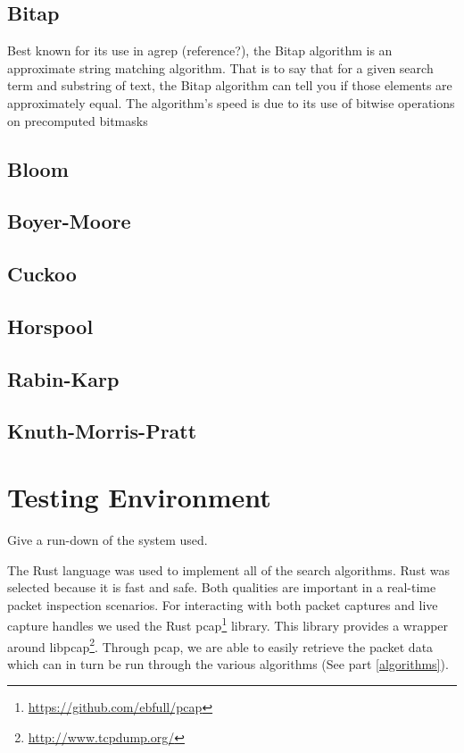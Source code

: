 \documentclass{article}
\begin{document}
\subsection{Bitap}

Best known for its use in agrep (reference?), the Bitap algorithm \cite{Baeza1992} is an approximate string matching algorithm. That is to say that for a given search term and substring of text, the Bitap algorithm can tell you if those elements are approximately equal. The algorithm's speed is due to its use of bitwise operations on precomputed bitmasks 

\subsection{Bloom}
\cite{Bloom1970}
\subsection{Boyer-Moore}
\cite{Boyer1977}
\subsection{Cuckoo}
\cite{Fan2014}
\subsection{Horspool}
\cite{Horspool1980}
\subsection{Rabin-Karp}
\cite{Karp1987}
\subsection{Knuth-Morris-Pratt}
\cite{Knuth1977}

\section{Testing Environment}	
Give a run-down of the system used.

The Rust language was used to implement all of the search algorithms. Rust was selected because it is fast and safe. Both  qualities are important in a real-time packet inspection scenarios. For interacting with both packet captures and live capture handles we used the Rust pcap\footnote{\url{https://github.com/ebfull/pcap}} library. This library provides a wrapper around libpcap\footnote{\url{http://www.tcpdump.org/}}. Through pcap, we are able to easily retrieve the packet data which can in turn be run through the various algorithms (See part \ref{algorithms}).
\end{document}
